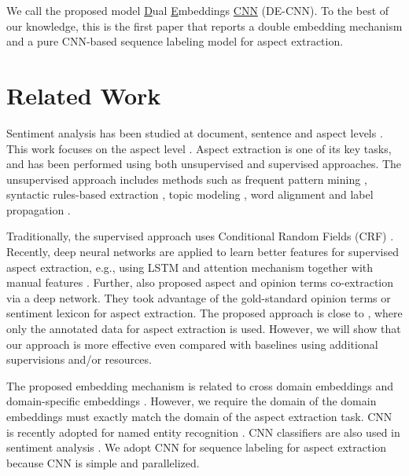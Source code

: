 \documentclass[11pt,a4paper]{article}
\begin{document}
We call the proposed model \underline{D}ual \underline{E}mbeddings \underline{CNN} (DE-CNN).
To the best of our knowledge, this is the first paper that reports a double embedding mechanism and a pure CNN-based sequence labeling model for aspect extraction.

\section{Related Work}
Sentiment analysis has been studied at document, sentence and aspect levels \cite{Liu2012,Pang2008OMS,Cambria2012}. This work focuses on the aspect level \cite{HuL2004}. Aspect extraction is one of its key tasks, and has been performed using both unsupervised and supervised approaches. 
The unsupervised approach includes methods such as frequent pattern mining \cite{HuL2004,PopescuNE2005}, syntactic rules-based extraction \cite{ZhuangJZ2006,WangBo2008,QiuLBC2011}, topic modeling \cite{MeiLWSZ2007,TitovM2008,Lin2009,Moghaddam2011}, word alignment \cite{KangLiu2013IJCAI} and label propagation \cite{Zhou-wan-xiao:2013:EMNLP}.

Traditionally, the supervised approach \cite{Jakob2010,Mitchell-EtAl:2013:EMNLP,shu2017lifelong} uses Conditional Random Fields (CRF) \cite{Lafferty2001conditional}.
Recently, deep neural networks are applied to learn better features for supervised aspect extraction, e.g., using
LSTM \cite{williams1989learning,hochreiter1997long,liu2015fine} and
attention mechanism \cite{wang2017coupled,he2017unsupervised} together with manual features \cite{poria2016aspect,wang2016recursive}.
Further, \cite{wang2016recursive,wang2017coupled,li2017deep} also proposed aspect and opinion terms co-extraction via a deep network.
They took advantage of the gold-standard opinion terms or sentiment lexicon for aspect extraction.
The proposed approach is close to \cite{liu2015fine}, where only the annotated data for aspect extraction is used. 
However, we will show that our approach is more effective even compared with baselines using additional supervisions and/or resources.

The proposed embedding mechanism is related to cross domain embeddings \cite{bollegala2015unsupervised,bollegala2017think} and domain-specific embeddings \cite{xumeta,Xu2018pro}. 
However, we require the domain of the domain embeddings must exactly match the domain of the aspect extraction task. 
CNN \cite{lecun1995convolutional,kim2014convolutional} is recently adopted for named entity recognition \cite{strubell2017fast}.
CNN classifiers are also used in sentiment analysis \cite{poria2016aspect,chen2017improving}.
We adopt CNN for sequence labeling for aspect extraction because CNN is simple and parallelized.
\end{document}
